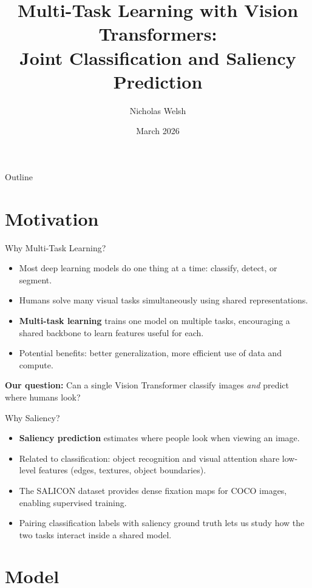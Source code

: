 \documentclass{beamer}
\title[Multi-Task ViT]{Multi-Task Learning with Vision Transformers:\\Joint Classification and Saliency Prediction}
\author{Nicholas Welsh}
\institute{Florida Institute of Technology\\Department of Computer Science \& Mathematics}
\date{March 2026}
\begin{document}
\begin{frame}
  \titlepage
\end{frame}

\begin{frame}{Outline}
  \tableofcontents
\end{frame}

\section{Motivation}

\begin{frame}{Why Multi-Task Learning?}
\begin{itemize}
  \item Most deep learning models do one thing at a time: classify, detect, or segment.
  \item Humans solve many visual tasks simultaneously using shared representations.
  \item \textbf{Multi-task learning} trains one model on multiple tasks, encouraging a shared backbone to learn features useful for each.
  \item Potential benefits: better generalization, more efficient use of data and compute.
\end{itemize}
\vfill
\textbf{Our question:} Can a single Vision Transformer classify images \emph{and} predict where humans look?
\end{frame}

\begin{frame}{Why Saliency?}
\begin{itemize}
  \item \textbf{Saliency prediction} estimates where people look when viewing an image.
  \item Related to classification: object recognition and visual attention share low-level features (edges, textures, object boundaries).
  \item The SALICON dataset provides dense fixation maps for COCO images, enabling supervised training.
  \item Pairing classification labels with saliency ground truth lets us study how the two tasks interact inside a shared model.
\end{itemize}
\end{frame}

\section{Model}
\end{document}
